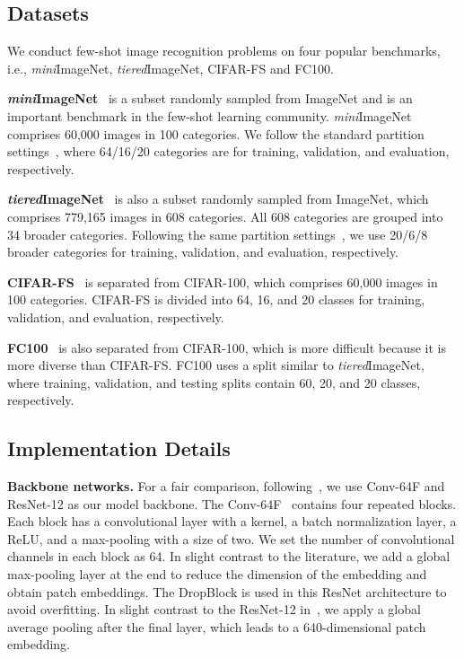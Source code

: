 \documentclass{SCIS2019}
\begin{document}
\subsection{Datasets}
We conduct few-shot image recognition problems on four popular benchmarks, i.e., \emph{mini}ImageNet, \emph{tiered}ImageNet, CIFAR-FS and FC100.

\textbf{\emph{mini}ImageNet}~\cite{6} is a subset randomly sampled from ImageNet and is an important benchmark in the few-shot learning community. \emph{mini}ImageNet comprises 60,000 images in 100 categories. We follow the standard partition settings~\cite{7}, where 64/16/20 categories are for training, validation, and evaluation, respectively.

\textbf{\emph{tiered}ImageNet}~\cite{22} is also a subset randomly sampled from ImageNet, which comprises 779,165 images in 608 categories. All 608 categories are grouped into
34 broader categories. Following the same partition settings~\cite{14}, we use 20/6/8 broader categories for training, validation, and evaluation, respectively.

\textbf{CIFAR-FS}~\cite{23} is separated from CIFAR-100, which comprises 60,000 images in 100 categories. CIFAR-FS is divided into 64, 16, and 20 classes for training, validation, and evaluation, respectively.

\textbf{FC100}~\cite{24} is also separated from CIFAR-100, which is more difficult because it is more diverse than CIFAR-FS. FC100 uses a split similar to \emph{tiered}ImageNet, where training, validation, and testing splits contain 60, 20, and 20 classes, respectively.



\subsection{Implementation Details}
\textbf{Backbone networks.} For a fair comparison, following~\cite{25}, we use Conv-64F and ResNet-12 as our model backbone. The Conv-64F~\cite{19,7} contains four repeated blocks. Each block has a convolutional layer with a  kernel, a batch normalization layer, a ReLU, and a max-pooling with a size of two. We set the number of convolutional channels in each block as 64. In slight contrast to the literature, we add a global max-pooling layer at the end to reduce the dimension of the embedding and obtain patch embeddings. The DropBlock is used in this ResNet architecture to avoid overfitting. In slight contrast to the ResNet-12 in~\cite{29}, we apply a global average pooling after the final layer, which leads to a 640-dimensional patch embedding.
\end{document}
